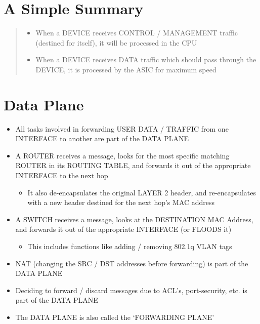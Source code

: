 \section{A Simple Summary}\label{a-simple-summary}

\begin{quote}
\begin{itemize}
\tightlist
\item
  When a DEVICE receives CONTROL / MANAGEMENT traffic (destined for
  itself), it will be processed in the CPU
\item
  When a DEVICE receives DATA traffic which should pass through the
  DEVICE, it is processed by the ASIC for maximum speed
\end{itemize}
\end{quote}

\section{Data Plane}\label{data-plane}

\begin{itemize}
\tightlist
\item
  All tasks involved in forwarding USER DATA / TRAFFIC from one
  INTERFACE to another are part of the DATA PLANE
\item
  A ROUTER receives a message, looks for the most specific matching
  ROUTER in its ROUTING TABLE, and forwards it out of the appropriate
  INTERFACE to the next hop

  \begin{itemize}
  \tightlist
  \item
    It also de-encapsulates the original LAYER 2 header, and
    re-encapsulates with a new header destined for the next hop's MAC
    address
  \end{itemize}
\item
  A SWITCH receives a message, looks at the DESTINATION MAC Address, and
  forwards it out of the appropriate INTERFACE (or FLOODS it)

  \begin{itemize}
  \tightlist
  \item
    This includes functions like adding / removing 802.1q VLAN tags
  \end{itemize}
\item
  NAT (changing the SRC / DST addresses before forwarding) is part of
  the DATA PLANE
\item
  Deciding to forward / discard messages due to ACL's, port-security,
  etc. is part of the DATA PLANE
\item
  The DATA PLANE is also called the `FORWARDING PLANE'
\end{itemize}

